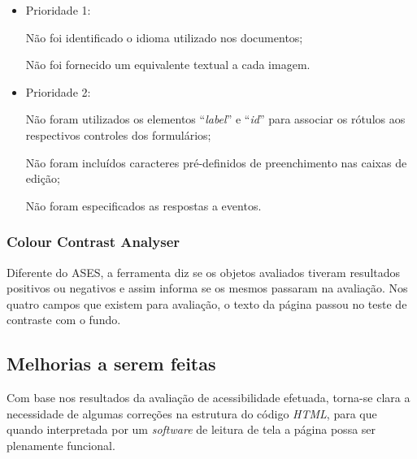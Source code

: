     \begin{itemize}
    \item Prioridade 1:
    
    Não foi identificado o idioma utilizado nos documentos;

    Não foi fornecido um equivalente textual a cada imagem.
    \item Prioridade 2:   
    
    Não foram utilizados os elementos “\textit{label}” e “\textit{id}” para associar os rótulos aos 
    respectivos controles dos formulários;

    Não foram incluídos caracteres pré-definidos de preenchimento nas caixas de edição;

    Não foram especificados as respostas a eventos.
    \end{itemize}
    
    \subsubsection{Colour Contrast Analyser}
    
    Diferente do ASES, a ferramenta diz se os objetos avaliados
    tiveram resultados positivos ou negativos e assim informa se os mesmos passaram na 
    avaliação. Nos quatro campos que existem para avaliação, o texto da página passou no teste 
    de contraste com o fundo.
    
    \subsection{Melhorias a serem feitas}
    
    Com base nos resultados da avaliação de acessibilidade efetuada, torna-se clara a
    necessidade de algumas correções na estrutura do código \textit{HTML},  para que quando 
    interpretada por um \textit{software} de leitura de tela a página possa ser plenamente funcional.